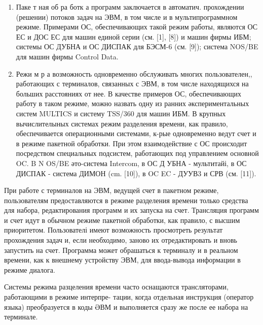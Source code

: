 \documentclass[10pt]{article}
\begin{document}
\begin{enumerate}

  \item Паке т ная об ра ботк а программ заключается в автоматич. прохождении (решении) потоков задач на ЭВМ, в том числе и в мультипрограммном режиме. Примерами ОС, обеспечивающих такой режим работы, являются ОС ЕС и ДОС ЕС для машин единой серии (см. [1], [8]) и машин фирмы ИБМ; системы ОС ДУБНА и ОС ДИСПАК для БЭСМ-6 (см. [9]); система NOS/BE для машин фирмы Control Data.



  \item Режи м р а возможность одновременно обслуживать многих пользователен,, работающих с терминалов, связанных с ЭВМ, в том числе находящихся на больших расстояниях от нее. В качестве примеров ОС, обеспечивающих работу в таком режиме, можно назвать одну из ранних әкспериментальных систем MULTICS и систему TSS/360 для машин ИБМ. В крупных вычислителыных системах режим разделения времени, как правило, обеспечивается операционными системами, к-рые одновременно ведут счет и в режиме пакетной обработки. При этом взаимодействие с ОС происходит посредством специальных подсистем, работающих под управлением основной OC. B N OS/BE әто-система Intercom, в ОС Д УБНА - мультитайі, в ОС ДИСПАК - система ДИМОН (cm. [10]), в OC EC - ДУУВ3 и СРВ (см. [11]).



\end{enumerate}



При работе с терминалов на ЭВМ, ведущей счет в пакетном режиме, пользователям предоставляются в режиме разделения времени только средства для набора, редактирования программ и их запуска на счет. Трансляция программ и счет идут в обычном режиме пакетной обработки, как правило, с высшим приоритетом. Пользователі имеют возможность просмотреть результат прохождения задач и, если необходимо, заново их отредактировать и вновь запустить на счет. Программа может обрашаться к терминалу и в реальном времени, как к внешнему устройству ЭВМ, для ввода-вывода информации в режиме диалога.



Системы режима разцеления времени часто оснащаются трансляторами, работающими в режиме интерпре- тации, когда отдельная инструкция (оператор языка) преобразуется в коды ӘВМ и выполняется сразу же после ее набора на терминале.
\end{document}
